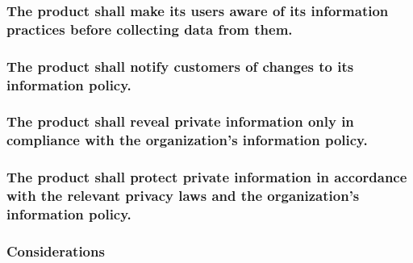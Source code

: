 \documentclass[
]{article}
\begin{document}
\hypertarget{the-product-shall-make-its-users-aware-of-its-information-practices-before-collecting-data-from-them.}{%
\subsubsection{The product shall make its users aware of its information
practices before collecting data from
them.}\label{the-product-shall-make-its-users-aware-of-its-information-practices-before-collecting-data-from-them.}}

\hypertarget{the-product-shall-notify-customers-of-changes-to-its-information-policy.}{%
\subsubsection{The product shall notify customers of changes to its
information
policy.}\label{the-product-shall-notify-customers-of-changes-to-its-information-policy.}}

\hypertarget{the-product-shall-reveal-private-information-only-in-compliance-with-the-organizations-information-policy.}{%
\subsubsection{The product shall reveal private information only in
compliance with the organization's information
policy.}\label{the-product-shall-reveal-private-information-only-in-compliance-with-the-organizations-information-policy.}}

\hypertarget{the-product-shall-protect-private-information-in-accordance-with-the-relevant-privacy-laws-and-the-organizations-information-policy.}{%
\subsubsection{\texorpdfstring{The product shall protect private
information in accordance with the relevant privacy laws and the
organization's information policy.
}{The product shall protect private information in accordance with the relevant privacy laws and the organization's information policy. }}\label{the-product-shall-protect-private-information-in-accordance-with-the-relevant-privacy-laws-and-the-organizations-information-policy.}}

\hypertarget{considerations-38}{%
\subsubsection{Considerations}\label{considerations-38}}
\end{document}
